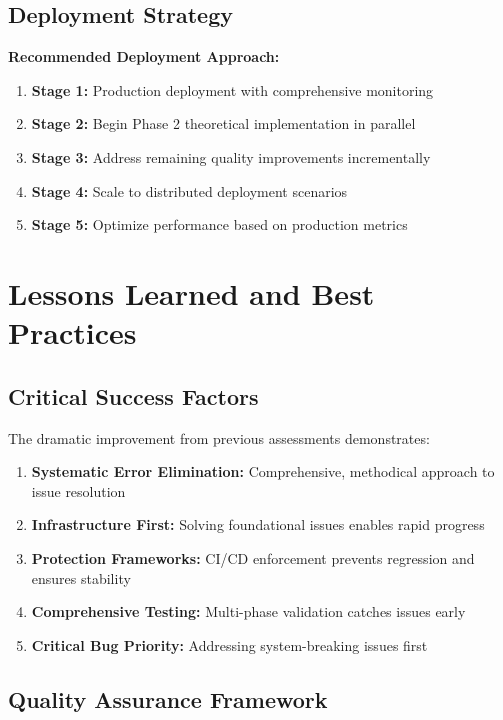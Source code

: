 \documentclass[11pt,a4paper]{article}
\begin{document}
\subsection{Deployment Strategy}

\textbf{Recommended Deployment Approach:}
\begin{enumerate}
    \item \textbf{Stage 1:} Production deployment with comprehensive monitoring
    \item \textbf{Stage 2:} Begin Phase 2 theoretical implementation in parallel
    \item \textbf{Stage 3:} Address remaining quality improvements incrementally
    \item \textbf{Stage 4:} Scale to distributed deployment scenarios
    \item \textbf{Stage 5:} Optimize performance based on production metrics
\end{enumerate}

\section{Lessons Learned and Best Practices}

\subsection{Critical Success Factors}

The dramatic improvement from previous assessments demonstrates:

\begin{enumerate}
    \item \textbf{Systematic Error Elimination:} Comprehensive, methodical approach to issue resolution
    \item \textbf{Infrastructure First:} Solving foundational issues enables rapid progress
    \item \textbf{Protection Frameworks:} CI/CD enforcement prevents regression and ensures stability
    \item \textbf{Comprehensive Testing:} Multi-phase validation catches issues early
    \item \textbf{Critical Bug Priority:} Addressing system-breaking issues first
\end{enumerate}

\subsection{Quality Assurance Framework}
\end{document}
